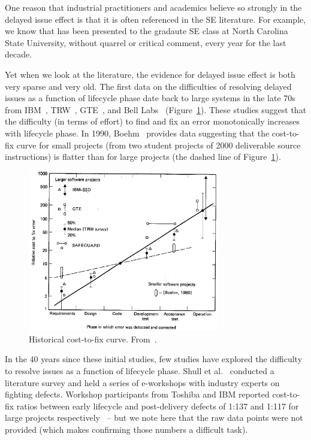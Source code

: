 One reason that industrial practitioners and academics believe so strongly in the delayed issue effect is that it is often referenced
in the SE literature. For example,
we know that  has been presented to the gradaute SE class at North Carolina State University, without quarrel or critical comment, every year for the last decade.

Yet when we look at the literature, the evidence for
delayed issue effect is both very sparse and very old.
The first data on the difficulties of resolving delayed issues as a function of lifecycle phase date back to large systems in the late 70s from IBM~\cite{Fagan76}, TRW~\cite{Boehm76}, GTE~\cite{Daly77}, and Bell Labs~\cite{Stephenson76} (Figure~\ref{fig:cost-to-fix}). These studies suggest that the difficulty (in terms of effort) to find and fix an error monotonically increases with lifecycle phase.  In 1990, Boehm~\cite{Boehm80} provides data suggesting that the cost-to-fix curve for small projects (from two student projects of 2000 deliverable source instructions) is flatter than for large projects (the dashed line of Figure~\ref{fig:cost-to-fix}).

\begin{figure}[!b]
 \includegraphics[width=3.3in]{img/boehm_cost-to-fix.png}
 \caption{Historical cost-to-fix curve. From~\cite{Boehm81}.}\label{fig:cost-to-fix}
 \end{figure}
 
In the 40 years since these initial studies, few studies have explored the difficulty to resolve issues
as a function of lifecycle phase. 
Shull et al.~\cite{Shull02} conducted a literature survey and held a series of e-workshops with industry experts on fighting defects. Workshop participants from Toshiba and IBM reported cost-to-fix ratios between early lifecycle and post-delivery defects of 1:137 and 1:117 for large projects respectively~\cite{Shull02} -- but we note here that the raw data points were not provided (which makes confirming those numbers 
a difficult task). 

